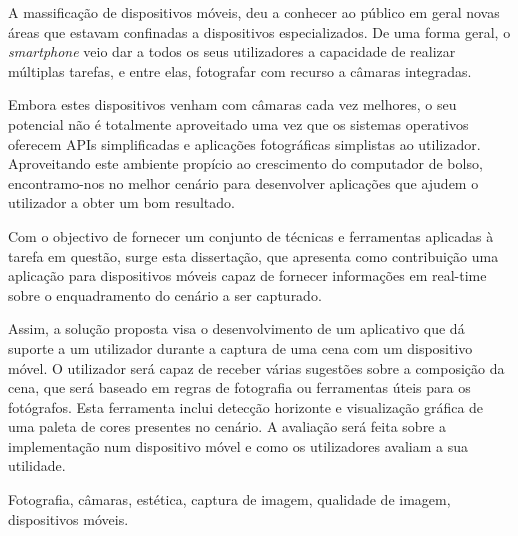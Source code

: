 \abstractPT 
A massificação de dispositivos móveis, deu a conhecer ao público em geral novas áreas que estavam confinadas a dispositivos especializados. De uma forma geral, o \emph{smartphone} veio dar a todos os seus utilizadores a capacidade de realizar múltiplas tarefas, e entre elas, fotografar com recurso a câmaras integradas.


Embora estes dispositivos venham com câmaras cada vez melhores, o seu potencial não é totalmente aproveitado uma vez que os sistemas operativos oferecem APIs simplificadas e aplicações fotográficas simplistas ao utilizador. Aproveitando este ambiente propício ao crescimento do computador de bolso, encontramo-nos no melhor cenário para desenvolver aplicações que ajudem o utilizador a obter um bom resultado.


Com o objectivo de fornecer um conjunto de técnicas e ferramentas aplicadas à tarefa em questão, surge esta dissertação, que apresenta como contribuição uma aplicação para dispositivos móveis capaz de fornecer informações em real-time sobre o enquadramento do cenário a ser capturado.



Assim, a solução proposta visa o desenvolvimento de um aplicativo que dá suporte a um utilizador durante a captura de uma cena com um dispositivo móvel. O utilizador será capaz de receber várias sugestões sobre a composição da cena, que será baseado em regras de fotografia ou ferramentas úteis para os fotógrafos. Esta ferramenta inclui detecção horizonte e visualização gráfica de uma paleta de cores presentes no cenário. A avaliação será feita sobre a implementação num dispositivo móvel e como os utilizadores avaliam a sua utilidade.

\begin{keywords}
Fotografia, câmaras, estética, captura de imagem, qualidade de imagem, dispositivos móveis.
\end{keywords}

